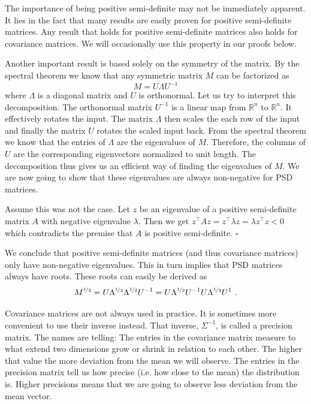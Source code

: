 \documentclass[a4paper,11pt,leqno]{report}\usepackage[]{graphicx}\usepackage[]{color}
\begin{document}
The importance of being positive semi-definite may not be immediately apparent. It lies in the fact that many results are easily proven for positive semi-definite 
matrices. Any result that holds for positive semi-definite matrices also holds for covariance matrices. We will occasionally use this property in our proofs below.

Another important result is based solely on the symmetry of the matrix. By the spectral theorem we know that any symmetric matrix $ M $ can be factorized as
\begin{equation}\label{eq:eigenvalueDecomp}
M = U \Lambda U^{-1}
\end{equation}
where $ \Lambda $ is a diagonal matrix and $ U $ is orthonormal. Let us try to interpret this decomposition. The orthonormal matrix $ U^{-1} $ is a linear map from
$ \mathbb{R}^{n} $ to $ \mathbb{R}^{n} $. It effectively rotates the input. The matrix $ \Lambda $ then scales the each row of the input and finally the matrix
$ U $ rotates the scaled input back. From the spectral theorem we know that the entries of $ \Lambda $ are the eigenvalues of $ M $. Therefore, the columns of $ U $
are the corresponding eigenvectors normalized to unit length. The decomposition thus gives us an efficient way of finding the eigenvalues of $ M $. We are now going
to show that these eigenvalues are always non-negative for PSD matrices.

\begin{Lemma}
Assume this was not the case. Let $ z $ be an eigenvalue of a positive 
semi-definite matrix $ A $ with negative eigenvalue $ \lambda $. Then we get $ z^{\top}Az = z^{\top}\lambda z = \lambda z^{\top} z < 0 $ which contradicts the
premise that $ A $ is positive semi-definite. $ \square $
\end{Lemma}

We conclude that positive semi-definite matrices (and thus covariance matrices) only have non-negative eigenvalues.
This in turn implies that PSD matrices always have roots. These roots can easily be derived as 
\begin{equation}\label{eq:PSDRoots}
M^{\nicefrac{1}{2}} = U \Lambda^{\nicefrac{1}{2}}\Lambda^{\nicefrac{1}{2}} U^{-1} = U \Lambda^{\nicefrac{1}{2}}U^{-1} U \Lambda^{\nicefrac{1}{2}} U^{1} \ .
\end{equation} 

Covariance matrices are not always used in practice. It is sometimes more convenient to use their inverse instead. That inverse, $ \Sigma^{-1} $, is called a precision
matrix. The names are telling: The entries in the covariance matrix measure to what extend two dimensions grow or shrink in relation to each other. The higher
that value the more deviation from the mean we will observe. 
The entries in the precision matrix tell us how precise (i.e. how close to the mean) the distribution is. Higher
precisions means that we are going to observe less deviation from the mean vector.
\end{document}
